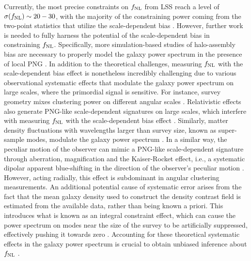 Currently, the most precise constraints on $f_{\rm NL}$ from LSS reach a level of $\sigma(f_{\rm NL}) \sim 20-30$, with the majority of the constraining power coming from the two-point statistics that utilize the scale-dependent bias \citep{2019JCAP...09..010C, mueller2022primordial, 2022PhRvD.106d3506C, 2022arXiv220111518D}. However, further work is needed to fully harness the potential of the scale-dependent bias in constraining $f_{\rm NL}$. Specifically, more simulation-based studies of halo-assembly bias are necessary to properly model the galaxy power spectrum in the presence of local PNG \citep{2020JCAP...12..013B, 2020JCAP...12..031B, 2022JCAP...11..013B, 2023JCAP...01..023L}. In addition to the theoretical challenges, measuring $f_{\rm NL}$ with the scale-dependent bias effect is nonetheless incredibly challenging due to various observational systematic effects that modulate the galaxy power spectrum on large scales, where the primordial signal is sensitive. For instance, survey geometry mixes clustering power on different angular scales \citep{beutler2014clustering,wilson2017rapid}. Relativistic effects also generate PNG-like scale-dependent signatures on large scales, which interfere with measuring $f_{\rm NL}$ with the scale-dependent bias effect \citep{wang2020}. Similarly, matter density fluctuations with wavelengths larger than survey size, known as super-sample modes, modulate the galaxy power spectrum \citep{castorina2020JCAP}. In a similar way, the peculiar motion of the observer can mimic a PNG-like scale-dependent signature through aberration, magnification and the Kaiser-Rocket effect, i.e., a systematic dipolar apparent blue-shifting in the direction of the observer's peculiar motion \citep{2021JCAP...11..027B}. However, acting radially, this effect is subdominant in angular clustering measurements. An additional potential cause of systematic error arises from the fact that the mean galaxy density used to construct the density contrast field is estimated from the available data, rather than being known a priori. This introduces what is known as an integral constraint effect, which can cause the power spectrum on modes near the size of the survey to be artificially suppressed, effectively pushing it towards zero \citep{peacock1991large,de2019integral}. Accounting for these theoretical systematic effects in the galaxy power spectrum is crucial to obtain unbiased inference about $f_{\rm NL}$ \citep[see, e.g.,][]{riquelme2022primordial}. 

